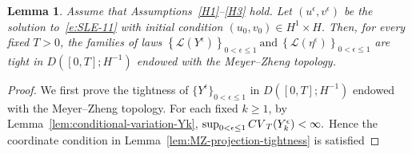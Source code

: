 \documentclass[10pt,a4paper]{amsart}
\theoremstyle{plain}
\newtheorem{lemma}[theorem]{Lemma}
\numberwithin{equation}{section}
\begin{document}
\begin{lemma}\label{thm:main3}
Assume that Assumptions~\ref{H1}--\ref{H3} hold. Let \((u^\epsilon,v^\epsilon)\) be the solution to~\eqref{e:SLE-11} with
initial condition \((u_0,v_0)\in H^1\times H .\) Then, for every fixed \(T>0\), the families of laws
\(\left\{\mathcal L(Y^\epsilon)\right\}_{0<\epsilon\le1} ~\text{and}~ \left\{\mathcal L(\eta^\epsilon)\right\}_{0<\epsilon\le1}\)
are tight in \(D([0,T];H^{-1})\) endowed with the Meyer--Zheng topology.
\end{lemma}

\begin{proof}
We first prove the tightness of \(\{Y^\epsilon\}_{0<\epsilon\le1}\) in \(D([0,T];H^{-1})\) endowed with the Meyer--Zheng topology.
For each fixed \(k\ge1\), by Lemma~\ref{lem:conditional-variation-Yk}, \(\sup_{0<\epsilon\le1}{\rm CV}_{T}(Y_k^\epsilon)<\infty .\)
Hence the coordinate condition in Lemma~\ref{lem:MZ-projection-tightness} is satisfied


\end{proof}
\end{document}
